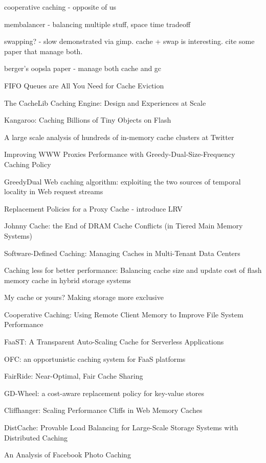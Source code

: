 	cooperative caching - opposite of us

membalancer - balancing multiple stuff, space time tradeoff

swapping? - slow demonstrated via gimp. cache + swap is interesting. cite some paper that manage both.

berger's oopsla paper - manage both cache and gc

FIFO Queues are All You Need for Cache Eviction

The CacheLib Caching Engine: Design and Experiences at Scale

Kangaroo: Caching Billions of Tiny Objects on Flash

A large scale analysis of hundreds of in-memory cache clusters at Twitter

Improving WWW Proxies Performance with Greedy-Dual-Size-Frequency Caching Policy

GreedyDual Web caching algorithm: exploiting the two sources of temporal locality in Web request streams

Replacement Policies for a Proxy Cache - introduce LRV

Johnny Cache: the End of DRAM Cache Conflicts (in Tiered Main Memory Systems)

Software-Defined Caching: Managing Caches in Multi-Tenant Data Centers

Caching less for better performance: Balancing cache size and update cost of flash memory cache in hybrid storage systems

My cache or yours? Making storage more exclusive

Cooperative Caching: Using Remote Client Memory to Improve File System Performance

FaaST: A Transparent Auto-Scaling Cache for Serverless Applications

OFC: an opportunistic caching system for FaaS platforms

FairRide: Near-Optimal, Fair Cache Sharing

GD-Wheel: a cost-aware replacement policy for key-value stores

Cliffhanger: Scaling Performance Cliffs in Web Memory Caches

DistCache: Provable Load Balancing for Large-Scale Storage Systems with Distributed Caching

An Analysis of Facebook Photo Caching